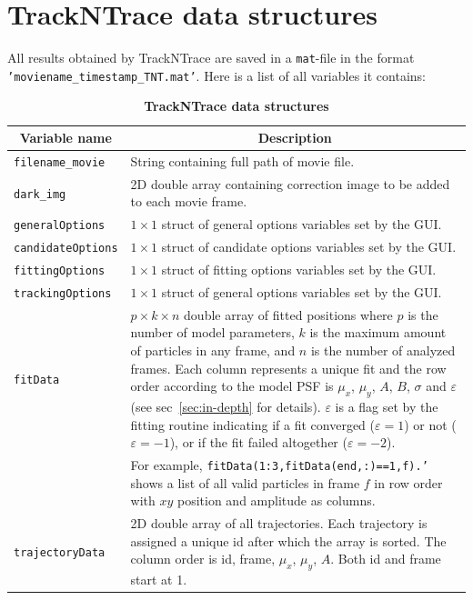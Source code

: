 \documentclass[11pt,onside]{report}
\numberwithin{equation}{chapter}
\begin{document}
\section{TrackNTrace data structures}
All results obtained by TrackNTrace are saved in a \texttt{mat}-file in the format \texttt{'moviename\_timestamp\_TNT.mat'}. Here is a list of all variables it contains:
\begin{table}[!h]
\centering
\caption*{\textbf{TrackNTrace data structures}}
\label{tab:datastruct}
\begin{tabular}{p{} p{}}
\toprule
\multicolumn{1}{c}{Variable name} & \multicolumn{1}{c}{Description}\\ \midrule
\texttt{filename\_movie} & String containing full path of movie file. \\[5pt]
\texttt{dark\_img} & 2D double array containing correction image to be added to each movie frame. \\[5pt]
\texttt{generalOptions} & $1\times1$ struct of general options variables set by the GUI. \\[5pt]
\texttt{candidateOptions} & $1\times1$ struct of candidate options variables set by the GUI. \\[5pt]
\texttt{fittingOptions} & $1\times1$ struct of fitting options variables set by the GUI. \\[5pt]
\texttt{trackingOptions} & $1\times1$ struct of general options variables set by the GUI. \\[5pt]
\texttt{fitData} & $p\times k\times n$ double array of fitted positions where $p$ is the number of model parameters, $k$ is the maximum amount of particles in any frame, and $n$ is the number of analyzed frames. Each column represents a unique fit and the row order according to the model PSF is $\mu_x$, $\mu_y$, $A$, $B$, $\sigma$ and $\varepsilon$ (see sec~\ref{sec:in-depth} for details). $\varepsilon$ is a flag set by the fitting routine indicating if a fit converged ($\varepsilon = 1$) or not ($\varepsilon = -1$), or if the fit failed altogether ($\varepsilon = -2$). \\
 & For example, \texttt{fitData(1:3,fitData(end,:)==1,f).'} shows a list of all valid particles in frame $f$ in row order with $xy$ position and amplitude as columns.\\[5pt]
\texttt{trajectoryData} & 2D double array of all trajectories. Each trajectory is assigned a unique id after which the array is sorted. The column order is id, frame, $\mu_x$, $\mu_y$, $A$. Both id and frame start at 1. \\
\bottomrule
\end{tabular}
\end{table}
\end{document}
